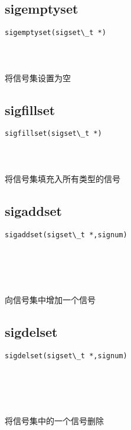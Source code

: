 \documentclass[10pt,a4paper]{article}
\begin{document}
\subsection{sigemptyset}
\begin{spacing}{2.0}
\lstset{language=C,numbers=none}
\begin{lstlisting}
sigemptyset(sigset\_t *)
\end{lstlisting}
{\large\color[rgb]{0.2,0.4,0.6}{*:}}
\paragraph{ \ \ }将信号集设置为空
\end{spacing}

\subsection{sigfillset}
\begin{spacing}{2.0}
\lstset{language=C,numbers=none}
\begin{lstlisting}
sigfillset(sigset\_t *)
\end{lstlisting}
{\large\color[rgb]{0.2,0.4,0.6}{*:}}
\paragraph{ \ \ }将信号集填充入所有类型的信号
\end{spacing}

\subsection{sigaddset}
\begin{spacing}{2.0}
\lstset{language=C,numbers=none}
\begin{lstlisting}
sigaddset(sigset\_t *,signum)
\end{lstlisting}
{\large\color[rgb]{0.2,0.4,0.6}{*:}} \\
{\large\color[rgb]{0.2,0.4,0.6}{signum:}}
\paragraph{ \ \ }向信号集中增加一个信号
\end{spacing}

\subsection{sigdelset}
\begin{spacing}{2.0}
\lstset{language=C,numbers=none}
\begin{lstlisting}
sigdelset(sigset\_t *,signum)
\end{lstlisting}
{\large\color[rgb]{0.2,0.4,0.6}{*:}} \\
{\large\color[rgb]{0.2,0.4,0.6}{signum:}}
\paragraph{ \ \ }将信号集中的一个信号删除
\end{spacing}
\end{document}
